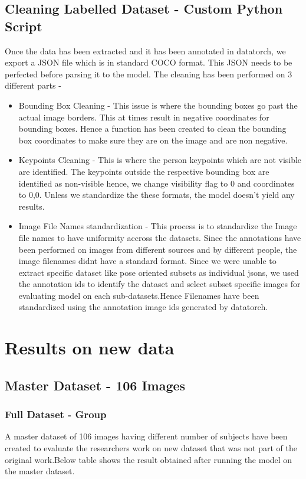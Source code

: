 \documentclass[a4paper,12pt]{article}
\begin{document}
\subsection{Cleaning Labelled Dataset - Custom Python Script}
Once the data has been extracted and it has been annotated in datatorch, we export a JSON file which is in standard COCO format. This JSON needs to be perfected before parsing it to the model. The cleaning has been performed on 3 different parts -
\begin{itemize}
\item Bounding Box Cleaning - This issue is where the bounding boxes go past the actual image borders. This at times result in negative coordinates for bounding boxes. Hence a function has been created to clean the bounding box coordinates to make sure they are on the image and are non negative.

\item Keypoints Cleaning - This is where the person keypoints which are not visible are identified. The keypoints outside the respective bounding box are identified as non-visible hence, we change visibility flag to 0 and coordinates to 0,0. Unless we standardize the these formats, the model doesn't yield any results.


\item Image File Names standardization - This process is to standardize the Image file names to have uniformity accross the datasets. Since the annotations have been performed on images from different sources and by different people, the image filenames didnt have a standard format. Since we were unable to extract specific dataset like pose oriented subsets as individual jsons, we used the annotation ids to identify the dataset and select subset specific images for evaluating model on each sub-datasets.Hence Filenames have been standardized using the annotation image ids generated by datatorch. 
\end{itemize}
\section{Results on new data}

\subsection{Master Dataset - 106 Images}

\subsubsection{Full Dataset - Group}
A master dataset of 106 images having different number of subjects have been created to evaluate the researchers work on new dataset that was not part of the original work.Below table shows the result obtained after running the model on the master dataset.
\end{document}
